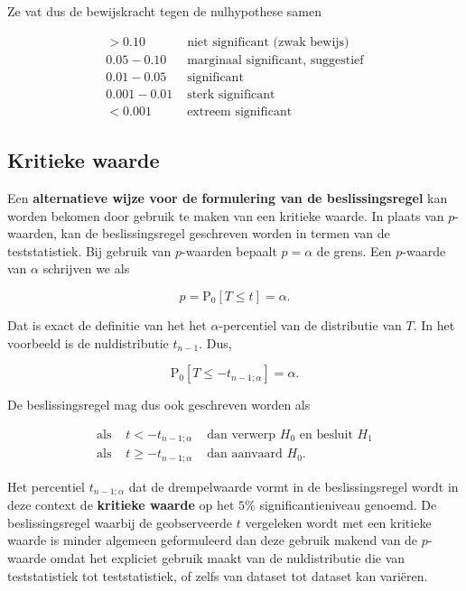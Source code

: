\documentclass[
  12pt,dutch,coursenotes]{book}
\begin{document}
Ze vat dus de bewijskracht tegen de nulhypothese samen

\[\begin{array}{cl}>0.10 & \text{ niet significant (zwak bewijs)}\\0.05-0.10 & \text{ marginaal significant, suggestief}\\0.01-0.05 & \text{ significant}\\0.001-0.01 & \text{ sterk significant}\\<0.001 & \text{ extreem significant}\end{array}\]

\hypertarget{kritieke-waarde}{%
\subsection{Kritieke waarde}\label{kritieke-waarde}}

Een \textbf{alternatieve wijze voor de formulering van de beslissingsregel} kan worden bekomen door gebruik te maken van een kritieke waarde.
In plaats van \(p\)-waarden, kan de beslissingsregel geschreven worden in termen van de teststatistiek.
Bij gebruik van \(p\)-waarden bepaalt \(p=\alpha\) de grens.
Een \(p\)-waarde van \(\alpha\) schrijven we als

\[p=\text{P}_0 \left[ T \leq t \right]=\alpha.\]

Dat is exact de definitie van het het \(\alpha\)-percentiel van de distributie van \(T\).
In het voorbeeld is de nuldistributie \(t_{n-1}\).
Dus,

\[\text{P}_0\left[T\leq -t_{n-1;\alpha}\right]=\alpha.\]

De beslissingsregel mag dus ook geschreven worden als

\begin{eqnarray*}
\text{als } & t< -t_{n-1;\alpha} & \text{ dan verwerp }H_0\text{ en besluit }H_1 \\
  \text{als } & t\geq -t_{n-1;\alpha} & \text{ dan aanvaard }H_0.
\end{eqnarray*}

Het percentiel \(t_{n-1;\alpha}\) dat de drempelwaarde vormt in de beslissingsregel wordt in deze context de \textbf{kritieke waarde} op het \(5\%\) significantieniveau genoemd.
De beslissingsregel waarbij de geobserveerde \(t\) vergeleken wordt met een kritieke waarde is minder algemeen geformuleerd dan deze gebruik makend van de \(p\)-waarde omdat het expliciet gebruik maakt van de nuldistributie die van teststatistiek tot teststatistiek, of zelfs van dataset tot dataset kan variëren.
\end{document}
